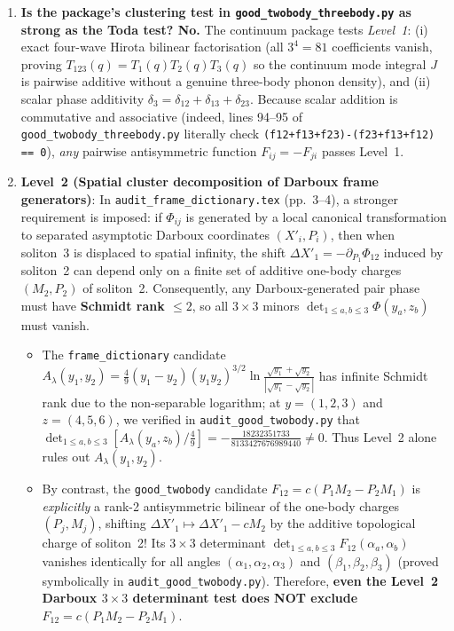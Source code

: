 \documentclass[11pt,a4paper]{article}
\begin{document}
\begin{enumerate}
\item \textbf{Is the package's clustering test in \texttt{good\_twobody\_threebody.py} as strong as the Toda test? No.}
The continuum package tests \emph{Level~1}: (i) exact four-wave Hirota bilinear factorisation (all $3^4=81$ coefficients vanish, proving $T_{123}(q)=T_1(q)T_2(q)T_3(q)$ so the continuum mode integral $J$ is pairwise additive without a genuine three-body phonon density), and (ii) scalar phase additivity $\delta_3 = \delta_{12}+\delta_{13}+\delta_{23}$. Because scalar addition is commutative and associative (indeed, lines 94--95 of \texttt{good\_twobody\_threebody.py} literally check \texttt{(f12+f13+f23)-(f23+f13+f12) == 0}), \emph{any} pairwise antisymmetric function $F_{ij}=-F_{ji}$ passes Level~1.
\item \textbf{Level~2 (Spatial cluster decomposition of Darboux frame generators)}:
In \texttt{audit\_frame\_dictionary.tex} (pp.~3--4), a stronger requirement is imposed: if $\Phi_{ij}$ is generated by a local canonical transformation to separated asymptotic Darboux coordinates $(X'_i, P_i)$, then when soliton~3 is displaced to spatial infinity, the shift $\Delta X'_1 = -\partial_{P_1}\Phi_{12}$ induced by soliton~2 can depend only on a finite set of additive one-body charges $(M_2, P_2)$ of soliton~2. Consequently, any Darboux-generated pair phase must have \textbf{Schmidt rank $\le 2$}, so all $3\times 3$ minors $\det_{1\le a,b\le 3}\Phi(y_a, z_b)$ must vanish.
\begin{itemize}
\item The \texttt{frame\_dictionary} candidate $A_\lambda(y_1,y_2) = \frac{4}{9}(y_1-y_2)(y_1 y_2)^{3/2}\ln\frac{\sqrt{y_1}+\sqrt{y_2}}{|\sqrt{y_1}-\sqrt{y_2}|}$ has infinite Schmidt rank due to the non-separable logarithm; at $y=(1,2,3)$ and $z=(4,5,6)$, we verified in \texttt{audit\_good\_twobody.py} that $\det_{1\le a,b\le 3}[A_\lambda(y_a,z_b)/\frac{4}{9}] = -\frac{18232351733}{8133427676989440} \neq 0$. Thus Level~2 alone rules out $A_\lambda(y_1,y_2)$.
\item By contrast, the \texttt{good\_twobody} candidate $F_{12} = c(P_1 M_2 - P_2 M_1)$ is \emph{explicitly} a rank-2 antisymmetric bilinear of the one-body charges $(P_j, M_j)$, shifting $\Delta X'_1 \mapsto \Delta X'_1 - c M_2$ by the additive topological charge of soliton~2! Its $3\times 3$ determinant $\det_{1\le a,b\le 3} F_{12}(\alpha_a,\alpha_b)$ vanishes identically for all angles $(\alpha_1,\alpha_2,\alpha_3)$ and $(\beta_1,\beta_2,\beta_3)$ (proved symbolically in \texttt{audit\_good\_twobody.py}). Therefore, \textbf{even the Level~2 Darboux $3\times 3$ determinant test does NOT exclude $F_{12} = c(P_1 M_2 - P_2 M_1)$}.

\end{itemize}
\end{enumerate}
\end{document}
